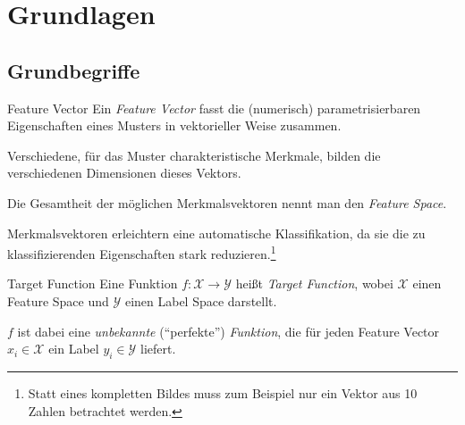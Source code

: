 \section{Grundlagen}

\subsection{Grundbegriffe}

\begin{defi}{Feature Vector}
    Ein \emph{Feature Vector} fasst die (numerisch) parametrisierbaren Eigenschaften eines Musters in vektorieller Weise zusammen.

    Verschiedene, für das Muster charakteristische Merkmale, bilden die verschiedenen Dimensionen dieses Vektors.

    Die Gesamtheit der möglichen Merkmalsvektoren nennt man den \emph{Feature Space}.

    Merkmalsvektoren erleichtern eine automatische Klassifikation, da sie die zu klassifizierenden Eigenschaften stark reduzieren.\footnote{Statt eines kompletten Bildes muss zum Beispiel nur ein Vektor aus 10 Zahlen betrachtet werden.}
\end{defi}

\begin{defi}{Target Function}
    Eine Funktion $f: \mathcal{X} \to \mathcal{Y}$ heißt \emph{Target Function}, wobei $\mathcal{X}$ einen Feature Space und $\mathcal{Y}$ einen Label Space darstellt.

    $f$ ist dabei eine \emph{unbekannte} (\enquote{perfekte}) \emph{Funktion}, die für jeden Feature Vector $x_i \in \mathcal{X}$ ein Label $y_i \in \mathcal{Y}$ liefert.
\end{defi}

